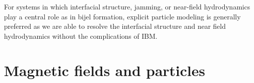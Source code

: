 For systems in which interfacial structure, jamming, or near-field hydrodynamics play a central role as in bijel formation, explicit particle modeling 
is generally preferred as we are able to resolve the interfacial structure and near field hydrodynamics without the complications of IBM.

\section{Magnetic fields and particles}










